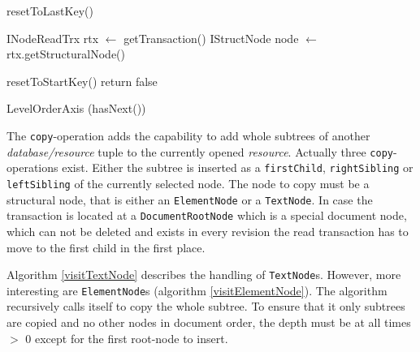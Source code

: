 \begin{algorithm}[Hhtbp]
{}
\BlankLine
{}
  
resetToLastKey()\;

INodeReadTrx rtx $\leftarrow$ getTransaction()\;
IStructNode node $\leftarrow$ rtx.getStructuralNode()\;






resetToStartKey()\;
return false\;
\caption{LevelOrderAxis (hasNext())}\label{levelOrderAxis}
\end{algorithm}

The \texttt{copy}-operation adds the capability to add whole subtrees of another \emph{database/resource} tuple to the currently opened \emph{resource}. Actually three \texttt{copy}-operations exist. Either the subtree is inserted as a \texttt{first\-Child}, \texttt{rightSibling} or \texttt{leftSibling} of the currently selected node. The node to copy must be a structural node, that is either an \texttt{ElementNode} or a \texttt{TextNode}. In case the transaction is located at a \texttt{DocumentRootNode} which is a special document node, which can not be deleted and exists in every revision the read transaction has to move to the first child in the first place.

Algorithm \ref{visitTextNode} describes the handling of \texttt{TextNode}s. However, more interesting are \texttt{ElementNode}s (algorithm \ref{visitElementNode}). The algorithm recursively calls itself to copy the whole subtree. To ensure that it only subtrees are copied and no other nodes in document order, the depth must be at all times $>$ 0 except for the first root-node to insert.

